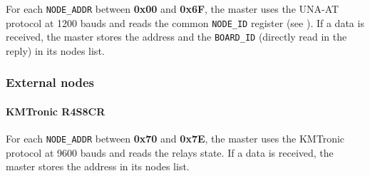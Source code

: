 For each \texttt{NODE\_ADDR} between \textbf{0x00} and \textbf{0x6F}, the master uses the UNA-AT protocol at 1200 bauds and reads the common \texttt{NODE\_ID} register (see ). If a data is received, the master stores the address and the \texttt{BOARD\_ID} (directly read in the reply) in its nodes list.

\subsubsection{External nodes}

\paragraph{KMTronic R4S8CR}

For each \texttt{NODE\_ADDR} between \textbf{0x70} and \textbf{0x7E}, the master uses the KMTronic protocol at 9600 bauds and reads the relays state. If a data is received, the master stores the address in its nodes list.

\newpage